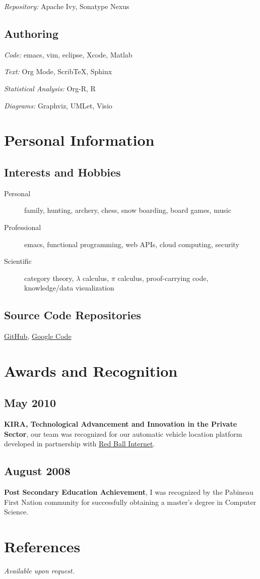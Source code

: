 \documentclass[11pt]{article}
\begin{document}
\emph{Repository:} Apache Ivy, Sonatype Nexus
\subsection{Authoring}
\label{sec-5-4}

\emph{Code:} emacs, vim, eclipse, Xcode, Matlab

\emph{Text:} Org Mode, ScribTeX, Sphinx
\label{statistical-analysis}

\emph{Statistical Analysis:} Org-R, R

\emph{Diagrams:} Graphviz, UMLet, Visio
\section{Personal Information}
\label{sec-6}
\subsection{Interests and Hobbies}
\label{sec-6-1}


\begin{description}
\item[Personal] family, hunting, archery, chess, snow boarding, board games, music
\item[Professional] emacs, functional programming, web APIs, cloud computing, security
\item[Scientific] category theory, $\lambda$ calculus, $\pi$ calculus, proof-carrying code, knowledge/data visualization
\end{description}
\subsection{Source Code Repositories}
\label{sec-6-2}


\href{https://github.com/reubenPeterPaul}{GitHub}, \href{http://code.google.com/u/101676264568220935370/}{Google Code}
\section{Awards and Recognition}
\label{sec-7}
\subsection{May 2010}
\label{sec-7-1}

   \textbf{KIRA, Technological Advancement and Innovation in the Private Sector}, our team was recognized for our automatic vehicle location platform developed in partnership with \href{http://redballinternet.com}{Red Ball Internet}.
\subsection{August 2008}
\label{sec-7-2}

   \textbf{Post Secondary Education Achievement}, I was recognized by the Pabineau First Nation community for successfully obtaining a master's degree in Computer Science.
\section{References}
\label{sec-8}

\emph{Available upon request.}
\end{document}
